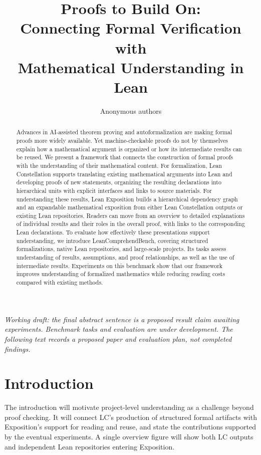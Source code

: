 \documentclass{article}
\title{Proofs to Build On:\\
Connecting Formal Verification with\\
Mathematical Understanding in Lean}
\author{Anonymous authors}
\begin{document}
\maketitle

\begin{abstract}
Advances in AI-assisted theorem proving and autoformalization are making formal proofs more widely available. Yet machine-checkable proofs do not by themselves explain how a mathematical argument is organized or how its intermediate results can be reused. We present a framework that connects the construction of formal proofs with the understanding of their mathematical content. For formalization, Lean Constellation supports translating existing mathematical arguments into Lean and developing proofs of new statements, organizing the resulting declarations into hierarchical units with explicit interfaces and links to source materials. For understanding these results, Lean Exposition builds a hierarchical dependency graph and an expandable mathematical exposition from either Lean Constellation outputs or existing Lean repositories. Readers can move from an overview to detailed explanations of individual results and their roles in the overall proof, with links to the corresponding Lean declarations. To evaluate how effectively these presentations support understanding, we introduce LeanComprehendBench, covering structured formalizations, native Lean repositories, and large-scale projects. Its tasks assess understanding of results, assumptions, and proof relationships, as well as the use of intermediate results. Experiments on this benchmark show that our framework improves understanding of formalized mathematics while reducing reading costs compared with existing methods.
\end{abstract}

\noindent\textit{Working draft: the final abstract sentence is a proposed result claim awaiting experiments. Benchmark tasks and evaluation are under development. The following text records a proposed paper and evaluation plan, not completed findings.}

\section{Introduction}
\label{sec:introduction}
The introduction will motivate project-level understanding as a challenge beyond proof checking. It will connect LC's production of structured formal artifacts with Exposition's support for reading and reuse, and state the contributions supported by the eventual experiments. A single overview figure will show both LC outputs and independent Lean repositories entering Exposition.
\end{document}
